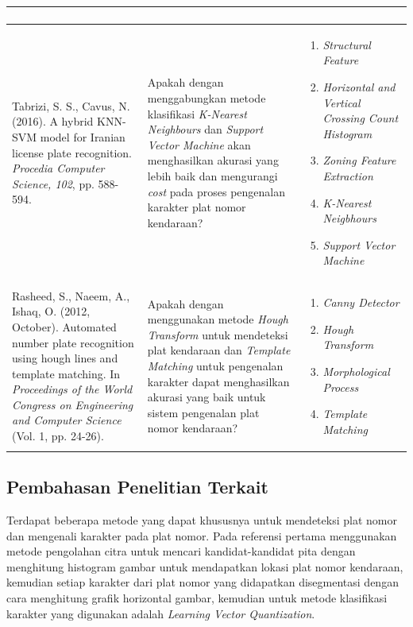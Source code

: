 \begin{small}
\begin{longtable}{ |p{5cm}|p{3.5cm}|p{3.6cm}| }
\begin{enumerate}[wide, labelwidth=!, labelindent=0pt, topsep=0pt]
\end{enumerate}\\
\hline
Tabrizi, S. S., Cavus, N. (2016). A hybrid KNN-SVM model for Iranian license plate recognition. \emph{Procedia Computer Science, 102}, pp. 588-594. & Apakah dengan menggabungkan metode klasifikasi \textit{K-Nearest Neighbours} dan \textit{Support Vector Machine} akan menghasilkan akurasi yang lebih baik dan mengurangi \textit{cost} pada proses pengenalan karakter plat nomor kendaraan? &
\begin{enumerate}[wide, labelwidth=!, labelindent=0pt, topsep=0pt]
\item \textit{Structural Feature}
\item \textit{Horizontal and Vertical Crossing Count Histogram}
\item \textit{Zoning Feature Extraction}
\item \textit{K-Nearest Neigbhours}
\item \textit{Support Vector Machine}
\end{enumerate}\\
\hline
Rasheed, S., Naeem, A., Ishaq, O. (2012, October). Automated number plate recognition using hough lines and template matching. In \emph{Proceedings of the World Congress on Engineering and Computer Science} (Vol. 1, pp. 24-26). & Apakah dengan menggunakan metode \textit{Hough Transform} untuk mendeteksi plat kendaraan dan \textit{Template Matching} untuk pengenalan karakter dapat menghasilkan akurasi yang baik untuk sistem pengenalan plat nomor kendaraan? &
\begin{enumerate}[wide, labelwidth=!, labelindent=0pt, topsep=0pt]
	\item \textit{Canny Detector}
	\item \textit{Hough Transform}
	\item \textit{Morphological Process}
	\item \textit{Template Matching}
\end{enumerate}
\label{tbl:StateoftheArt}\\
\hline
\end{longtable}
\end{small}
\endgroup
 
\subsection{Pembahasan Penelitian Terkait}
\noindent Terdapat beberapa metode yang dapat khususnya untuk mendeteksi plat nomor dan mengenali karakter pada plat nomor.
\noindent Pada referensi pertama \cite{nugroho} menggunakan metode pengolahan citra untuk mencari kandidat-kandidat pita dengan menghitung histogram gambar untuk mendapatkan lokasi plat nomor kendaraan, kemudian setiap karakter dari plat nomor yang didapatkan disegmentasi dengan cara menghitung grafik horizontal gambar, kemudian untuk metode klasifikasi karakter yang digunakan adalah \textit{Learning Vector Quantization}.

